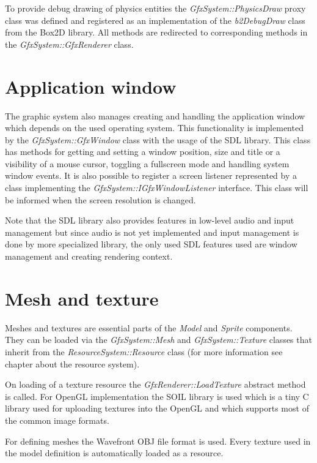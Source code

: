 \documentclass[a4paper, 12pt]{report}
\begin{document}
To provide debug drawing of physics entities the \emph{GfxSystem::PhysicsDraw} proxy class was defined and registered as an implementation of the \emph{b2\-Debug\-Draw} class from the Box2D library. All methods are redirected to corresponding methods in the \emph{GfxSystem::GfxRenderer} class.

\section{Application window}

The graphic system also manages creating and handling the application window which depends on the used operating system. This functionality is implemented by the \emph{GfxSystem::GfxWindow} class with the usage of the SDL library. This class has methods for getting and setting a window position, size and title or a visibility of a mouse cursor, toggling a fullscreen mode and handling system window events. It is also possible to register a screen listener represented by a class implementing the \emph{GfxSystem::IGfxWindowListener} interface. This class will be informed when the screen resolution is changed.

Note that the SDL library also provides features in low-level audio and input management but since audio is not yet implemented and input management is done by more specialized library, the only used SDL features used are window management and creating rendering context.

\section{Mesh and texture}

Meshes and textures are essential parts of the \emph{Model} and \emph{Sprite} components. They can be loaded via the \emph{GfxSystem::Mesh} and \emph{GfxSystem::Texture} classes that inherit from the \emph{ResourceSystem::Resource} class (for more information see chapter about the resource system).

On loading of a texture resource the \emph{GfxRenderer::LoadTexture} abstract method is called. For OpenGL implementation the SOIL library is used which is a tiny C library used for uploading textures into the OpenGL and which supports most of the common image formats.

For defining meshes the Wavefront OBJ file format \cite{obj} is used. Every texture used in the model definition is automatically loaded as a resource.
 
\end{document}
